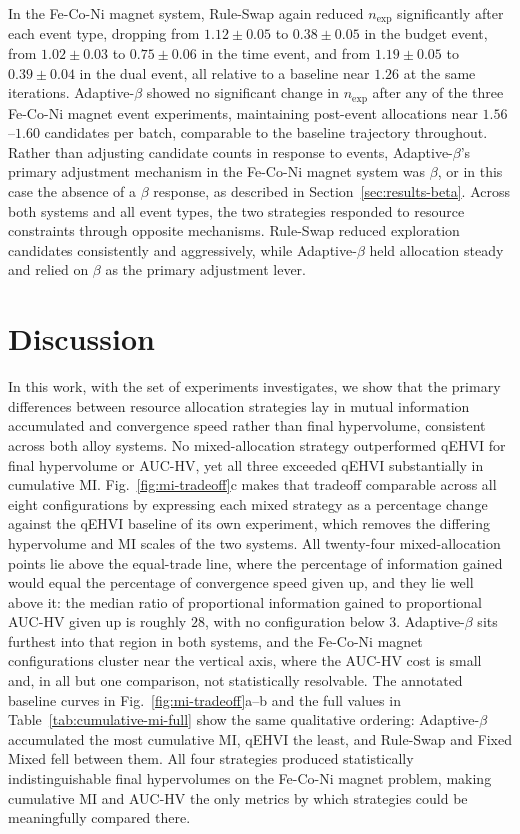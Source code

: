 In the Fe-Co-Ni magnet system, Rule-Swap again reduced $n_\mathrm{exp}$ significantly after each event type, dropping from $1.12 \pm 0.05$ to $0.38 \pm 0.05$ in the budget event, from $1.02 \pm 0.03$ to $0.75 \pm 0.06$ in the time event, and from $1.19 \pm 0.05$ to $0.39 \pm 0.04$ in the dual event, all relative to a baseline near $1.26$ at the same iterations. Adaptive-$\beta$ showed no significant change in $n_\mathrm{exp}$ after any of the three Fe-Co-Ni magnet event experiments, maintaining post-event allocations near $1.56$--$1.60$ candidates per batch, comparable to the baseline trajectory throughout. Rather than adjusting candidate counts in response to events, Adaptive-$\beta$'s primary adjustment mechanism in the Fe-Co-Ni magnet system was $\beta$, or in this case the absence of a $\beta$ response, as described in Section~\ref{sec:results-beta}. Across both systems and all event types, the two strategies responded to resource constraints through opposite mechanisms. Rule-Swap reduced exploration candidates consistently and aggressively, while Adaptive-$\beta$ held allocation steady and relied on $\beta$ as the primary adjustment lever.

\section{Discussion}
\label{sec:discussion}

In this work, with the set of experiments investigates, we show that the primary differences between resource allocation strategies lay in mutual information accumulated and convergence speed rather than final hypervolume, consistent across both alloy systems. No mixed-allocation strategy outperformed qEHVI for final hypervolume or AUC-HV, yet all three exceeded qEHVI substantially in cumulative MI. Fig.~\ref{fig:mi-tradeoff}c makes that tradeoff comparable across all eight configurations by expressing each mixed strategy as a percentage change against the qEHVI baseline of its own experiment, which removes the differing hypervolume and MI scales of the two systems. All twenty-four mixed-allocation points lie above the equal-trade line, where the percentage of information gained would equal the percentage of convergence speed given up, and they lie well above it: the median ratio of proportional information gained to proportional AUC-HV given up is roughly $28$, with no configuration below $3$. Adaptive-$\beta$ sits furthest into that region in both systems, and the Fe-Co-Ni magnet configurations cluster near the vertical axis, where the AUC-HV cost is small and, in all but one comparison, not statistically resolvable. The annotated baseline curves in Fig.~\ref{fig:mi-tradeoff}a--b and the full values in Table~\ref{tab:cumulative-mi-full} show the same qualitative ordering: Adaptive-$\beta$ accumulated the most cumulative MI, qEHVI the least, and Rule-Swap and Fixed Mixed fell between them. All four strategies produced statistically indistinguishable final hypervolumes on the Fe-Co-Ni magnet problem, making cumulative MI and AUC-HV the only metrics by which strategies could be meaningfully compared there.

